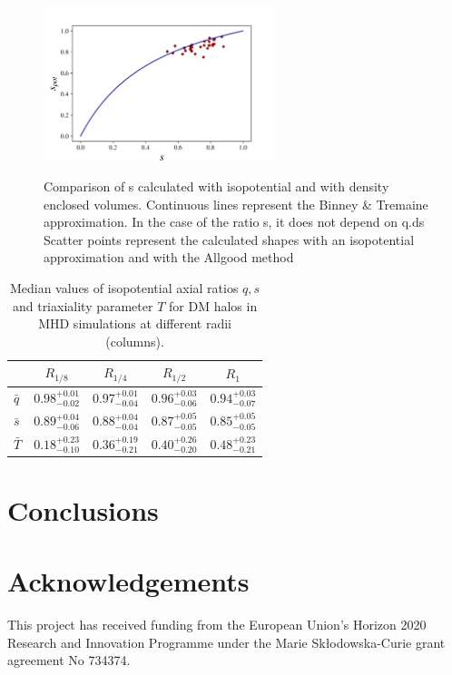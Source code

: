 \documentclass[a4paper,fleqn,usenatbib]{mnras}
\begin{document}
\begin{figure}
\centering
{\includegraphics[width=0.6\textwidth]{./pics/Shape_Methods/s_pot_Vs_s_den.png}}
\caption{Comparison of s calculated with isopotential and with density enclosed volumes. Continuous lines represent the Binney \& Tremaine approximation. In the case of the ratio s, it does not depend on q.ds Scatter points represent the calculated shapes with an isopotential approximation and with the Allgood method} \label{fig:shape_comp}
\end{figure} 



\begin{table}
\setlength{\tabcolsep}{3pt}
\begin{tabular}{l|cccc}
 & $R_{1/8}$& $R_{1/4}$& $R_{1/2}$& $R_1$ \\
\hline \hline
$\bar{q}$&$0.98^{+0.01}_{-0.02}$&$0.97^{+0.01}_{-0.04}$&$0.96^{+0.03}_{-0.06}$&$0.94^{+0.03}_{-0.07}$ \\[0.1cm]
$\bar{s}$&$0.89^{+0.04}_{-0.06}$&$0.88^{+0.04}_{-0.04}$&$0.87^{+0.05}_{-0.05}$&$0.85^{+0.05}_{-0.05}$ \\[0.1cm]
$\bar{T}$&$0.18^{+0.23}_{-0.10}$&$0.36^{+0.19}_{-0.21}$&$0.40^{+0.26}_{-0.20}$&$0.48^{+0.23}_{-0.21}$ \\[0.1cm]
\hline
\end{tabular}
\caption{Median values of isopotential axial ratios $q,s$ and triaxiality parameter $T$ for DM halos in MHD simulations at different radii (columns). }
\label{tabe:isopotential}
\end{table}


\section{Conclusions}


\section*{Acknowledgements}
This project has received funding from the European Union's Horizon
2020 Research and Innovation Programme under the Marie
Sk\l{}odowska-Curie grant agreement No 734374. 

 
 
\end{document}
